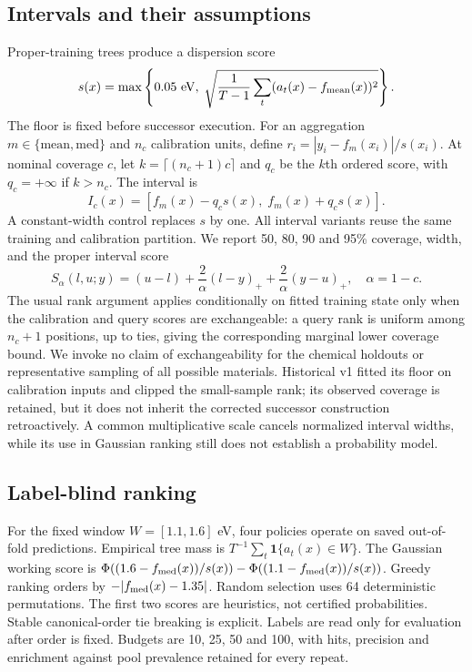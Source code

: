 \documentclass[11pt]{article}
\begin{document}
\subsection{Intervals and their assumptions}
Proper-training trees produce a dispersion score
\begin{equation}
 s(x)=\max\left\{0.05\ \mathrm{eV},\;\sqrt{\frac{1}{T-1}\sum_t(a_t(x)-f_{\rm mean}(x))^2}\right\}.
\end{equation}
The floor is fixed before successor execution. For an aggregation $m\in\{\mathrm{mean},\mathrm{med}\}$ and $n_c$ calibration units, define $r_i=|y_i-f_m(x_i)|/s(x_i)$. At nominal coverage $c$, let $k=\lceil(n_c+1)c\rceil$ and $q_c$ be the $k$th ordered score, with $q_c=+\infty$ if $k>n_c$. The interval is
\begin{equation}
 I_c(x)=[f_m(x)-q_cs(x),\;f_m(x)+q_cs(x)].
\end{equation}
A constant-width control replaces $s$ by one. All interval variants reuse the same training and calibration partition. We report 50, 80, 90 and 95\% coverage, width, and the proper interval score
\begin{equation}
 S_\alpha(l,u;y)=(u-l)+\frac{2}{\alpha}(l-y)_++\frac{2}{\alpha}(y-u)_+,\quad \alpha=1-c.
\end{equation}
The usual rank argument applies conditionally on fitted training state only when the calibration and query scores are exchangeable: a query rank is uniform among $n_c+1$ positions, up to ties, giving the corresponding marginal lower coverage bound. We invoke no claim of exchangeability for the chemical holdouts or representative sampling of all possible materials. Historical v1 fitted its floor on calibration inputs and clipped the small-sample rank; its observed coverage is retained, but it does not inherit the corrected successor construction retroactively. A common multiplicative scale cancels normalized interval widths, while its use in Gaussian ranking still does not establish a probability model.

\subsection{Label-blind ranking}
For the fixed window $W=[1.1,1.6]$ eV, four policies operate on saved out-of-fold predictions. Empirical tree mass is $T^{-1}\sum_t\mathbf1\{a_t(x)\in W\}$. The Gaussian working score is $\Phi((1.6-f_{\rm med}(x))/s(x))-\Phi((1.1-f_{\rm med}(x))/s(x))$. Greedy ranking orders by $-|f_{\rm med}(x)-1.35|$. Random selection uses 64 deterministic permutations. The first two scores are heuristics, not certified probabilities. Stable canonical-order tie breaking is explicit. Labels are read only for evaluation after order is fixed. Budgets are 10, 25, 50 and 100, with hits, precision and enrichment against pool prevalence retained for every repeat.
\end{document}
